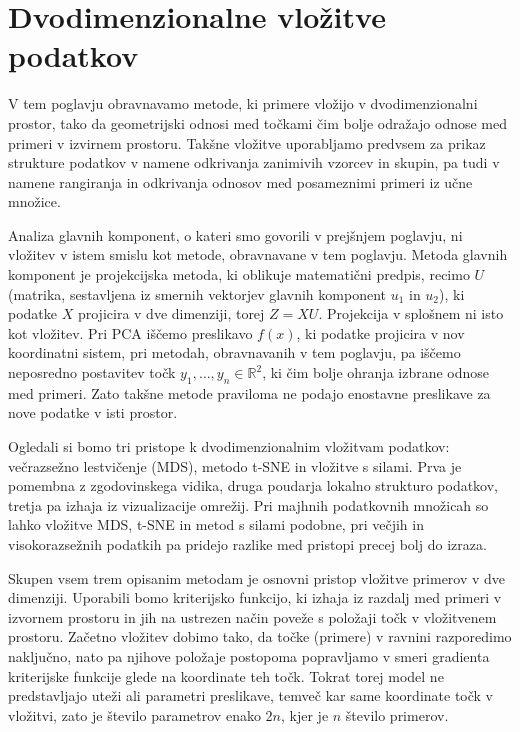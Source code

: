 \chapter{Dvodimenzionalne vložitve podatkov}

V tem poglavju obravnavamo metode, ki primere vložijo v dvodimenzionalni prostor, tako da geometrijski odnosi med točkami čim bolje odražajo odnose med primeri v izvirnem prostoru. Takšne vložitve uporabljamo predvsem za prikaz strukture podatkov v namene odkrivanja zanimivih vzorcev in skupin, pa tudi v namene rangiranja in odkrivanja odnosov med posameznimi primeri iz učne množice.

Analiza glavnih komponent, o kateri smo govorili v prejšnjem poglavju, ni vložitev v istem smislu kot metode, obravnavane v tem poglavju. Metoda glavnih komponent je projekcijska metoda, ki oblikuje matematični predpis, recimo \( U \) (matrika, sestavljena iz smernih vektorjev glavnih komponent \( u_1 \) in \( u_2 \)), ki podatke \( X \) projicira v dve dimenziji, torej \( Z = XU \). Projekcija v splošnem ni isto kot vložitev. Pri PCA iščemo preslikavo \( f(x) \), ki podatke projicira v nov koordinatni sistem, pri metodah, obravnavanih v tem poglavju, pa iščemo neposredno postavitev točk \( y_1, \dots, y_n \in \mathbb{R}^2 \),
%
%
ki čim bolje ohranja izbrane odnose med primeri. Zato takšne metode praviloma ne podajo enostavne preslikave za nove podatke v isti prostor.

Ogledali si bomo tri pristope k dvodimenzionalnim vložitvam podatkov: večrazsežno lestvičenje (MDS), metodo t-SNE in vložitve s silami. Prva je pomembna z zgodovinskega vidika, druga poudarja lokalno strukturo podatkov, tretja pa izhaja iz vizualizacije omrežij. Pri majhnih podatkovnih množicah so lahko vložitve MDS, t-SNE in metod s silami podobne, pri večjih in visokorazsežnih podatkih pa pridejo razlike med pristopi precej bolj do izraza.

Skupen vsem trem opisanim metodam je osnovni pristop vložitve primerov v dve dimenziji. Uporabili bomo kriterijsko funkcijo, ki izhaja iz razdalj med primeri v izvornem prostoru in jih na ustrezen način poveže s položaji točk v vložitvenem prostoru. Začetno vložitev dobimo tako, da točke (primere) v ravnini razporedimo naključno, nato pa njihove položaje postopoma popravljamo v smeri gradienta kriterijske funkcije glede na koordinate teh točk. Tokrat torej model ne predstavljajo uteži ali parametri preslikave, temveč kar same koordinate točk v vložitvi, zato je število parametrov enako $2n$, kjer je $n$ število primerov.

